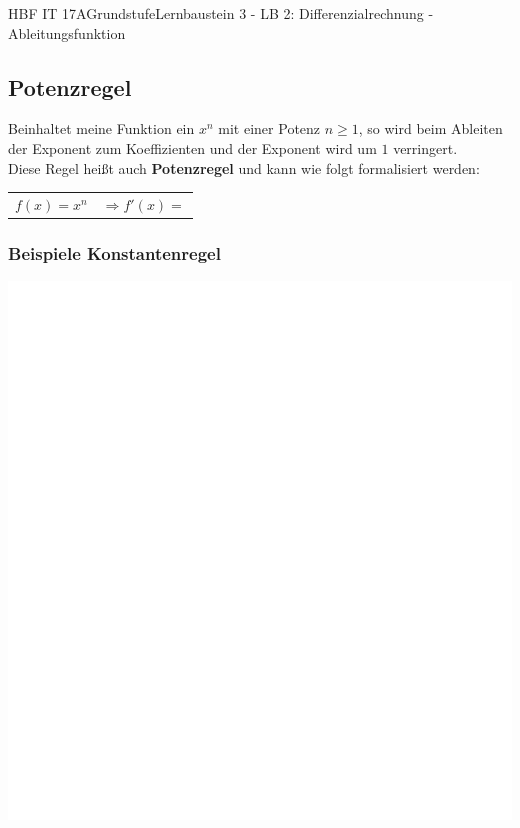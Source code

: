 \documentclass[11pt,twocolumn,oneside,openany,headings=optiontotoc,11pt,numbers=noenddot]{article}
\begin{document}
\begin{worksheet}{HBF IT 17A}{Grundstufe}{Lernbaustein 3 - LB 2: Differenzialrechnung - Ableitungsfunktion}
		\subsection{Potenzregel}
		Beinhaltet meine Funktion ein \(x^n\) mit einer Potenz \(n \geq 1\), so wird beim Ableiten der Exponent zum Koeffizienten und der Exponent wird um \(1\) verringert.\\
		Diese Regel heißt auch \textbf{Potenzregel} und kann wie folgt formalisiert werden:
		\begin{framed}
			\noindent
			\begin{tabularx}{0.7\textwidth}{lX}
				\(f(x) = x^n\) & \(\Rightarrow f'(x) = \)
			\end{tabularx}
		\end{framed}
		\subsubsection*{Beispiele Konstantenregel}
		\includegraphics[scale=0.2]{../empty.jpg}\\

\end{worksheet}
\end{document}
